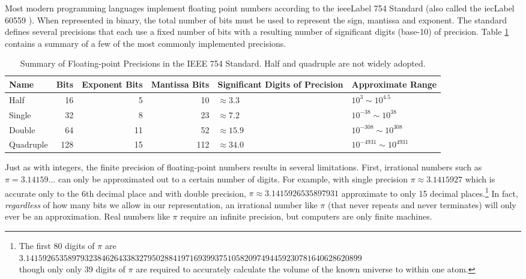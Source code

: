 Most modern programming languages implement floating point numbers according to the
\gls{ieeeLabel} 754 Standard \cite{P754:2008:ISF} (also called the \gls{iecLabel} 60559 \cite{IEC:1989:IBF}).
When represented in binary, the total number of bits must be used to represent the sign, mantissa
and exponent.  The standard defines several precisions that each use a fixed number of bits with
a resulting number of significant digits (base-10) of precision.  Table \ref{table:ieee754Summary}
contains a summary of a few of the most commonly implemented precisions.

\begin{table}
\centering
\begin{tabular}{l|r|r|r|p{3cm}|p{3cm}}
Name & Bits & Exponent Bits & Mantissa Bits & Significant Digits of Precision & Approximate Range\\
\hline\hline
Half & 16 & 5 & 10 & $\approx 3.3$ & $10^{3} \sim 10^{4.5}$\\
Single & 32 & 8 &  23 & $\approx 7.2$ & $10^{-38} \sim 10^{38}$\\
Double & 64 & 11 & 52 & $\approx 15.9$ & $10^{-308} \sim 10^{308}$ \\
Quadruple & 128 & 15 & 112 & $\approx 34.0$ & $10^{-4931} \sim 10^{4931}$ \\
\end{tabular}
\caption[Summary of Floating-point Precisions in the IEEE 754 Standard]{Summary of Floating-point Precisions in the IEEE 754 Standard.  Half and
quadruple are not widely adopted.}
\label{table:ieee754Summary}
\end{table}

Just as with integers, the finite precision of floating-point numbers results in 
several limitations.  First, irrational numbers such as $\pi = 3.14159\ldots$ 
can only be approximated out to a certain number of digits.  For example, 
with single precision $\pi \approx 3.1415927$ which is accurate only to the 
6th decimal place and with double precision, $\pi \approx 3.1415926535897931$
approximate to only 15 decimal places.\footnote{The first 80 digits of $\pi$ are\\ 
$3.14159265358979323846264338327950288419716939937510582097494459230781640628620899$\\ 
though only only 39 digits of $\pi$ are required to accurately calculate the volume of the known universe to within one atom.}
In fact, \emph{regardless} of how many bits we allow in our representation, 
an irrational number like $\pi$ (that never repeats and never terminates) will
only ever be an approximation.  Real numbers like $\pi$ require an infinite
precision, but computers are only finite machines.  

